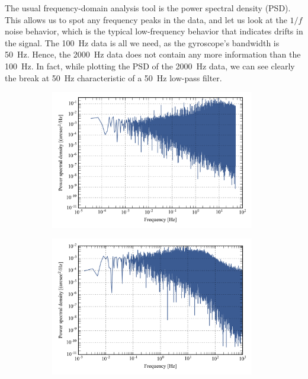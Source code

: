 The usual frequency-domain analysis tool is the power spectral density (PSD). This allows us to spot any frequency peaks in the data, and let us look at the $1/f$ noise behavior, which is the typical low-frequency behavior that indicates drifts in the signal. The \SI{100}{\hertz} data is all we need, as the gyroscope's bandwidth is \SI{50}{\hertz}. Hence, the \SI{2000}{\hertz} data does not contain any more information than the \SI{100}{\hertz}. In fact, while plotting the PSD of the \SI{2000}{\hertz} data, we can see clearly the break at \SI{50}{\hertz} characteristic of a \SI{50}{\hertz} low-pass filter.

\begin{figure}[!h]
\begin{subfigure}[b]{0.5\textwidth}

		\centering
		\includegraphics[width=0.98\textwidth]{Figures/sspwsd_11005.png} 
		\caption{}
		\label{subfig:sspsd11005}
\end{subfigure}
\begin{subfigure}[b]{0.5\textwidth}
		\centering
		\includegraphics[width=0.98\textwidth]{Figures/sspwsd2000_11005.png} 

\end{subfigure}
\end{figure}
